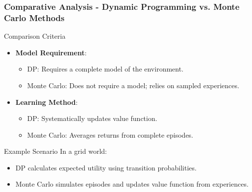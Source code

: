 \documentclass[aspectratio=169]{beamer}
\begin{document}
\begin{frame}[fragile]
  \frametitle{Comparative Analysis - Dynamic Programming vs. Monte Carlo Methods}
  \begin{block}{Comparison Criteria}
      \begin{itemize}
          \item \textbf{Model Requirement}:
              \begin{itemize}
                  \item DP: Requires a complete model of the environment.
                  \item Monte Carlo: Does not require a model; relies on sampled experiences.
              \end{itemize}

          \item \textbf{Learning Method}:
              \begin{itemize}
                  \item DP: Systematically updates value function.
                  \item Monte Carlo: Averages returns from complete episodes.
              \end{itemize}
      \end{itemize}
  \end{block}

  \begin{block}{Example Scenario}
      In a grid world:
      \begin{itemize}
          \item DP calculates expected utility using transition probabilities.
          \item Monte Carlo simulates episodes and updates value function from experiences.
      \end{itemize}
  \end{block}
\end{frame}
\end{document}
